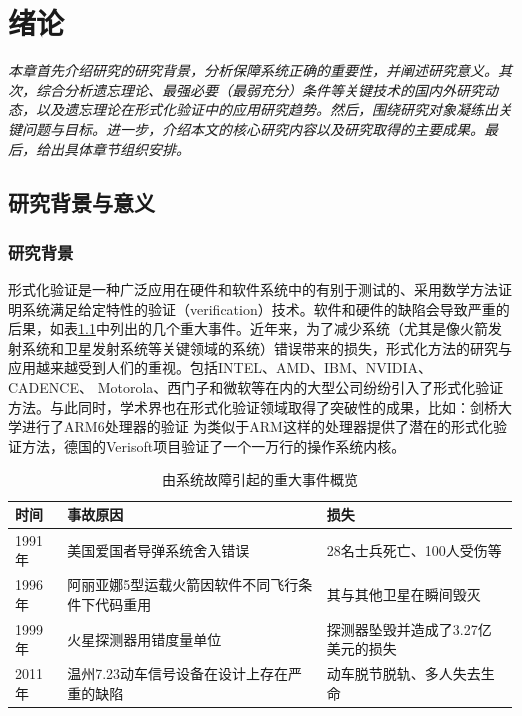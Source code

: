 \chapter{绪论}\label{chapter01}
{\em 本章首先介绍研究的研究背景，分析保障系统正确的重要性，并阐述研究意义。其次，综合分析遗忘理论、最强必要（最弱充分）条件等关键技术的国内外研究动态，以及遗忘理论在形式化验证中的应用研究趋势。然后，围绕研究对象凝练出关键问题与目标。进一步，介绍本文的核心研究内容以及研究取得的主要成果。最后，给出具体章节组织安排。}
\section{研究背景与意义}
\subsection{研究背景}

形式化验证是一种广泛应用在硬件\cite{lam2007,lv2000,jani2007Verilog}和软件系统中\cite{yuan2008,gu2005}的有别于测试的、采用数学方法证明系统满足给定特性的验证（verification）技术。软件和硬件的缺陷会导致严重的后果，如表\ref{tab:systemEvents_1.1}中列出的几个重大事件。近年来，为了减少系统（尤其是像火箭发射系统和卫星发射系统等关键领域的系统）错误带来的损失，形式化方法的研究与应用越来越受到人们的重视。包括INTEL、AMD、IBM、NVIDIA、CADENCE、 Motorola、西门子和微软等在内的大型公司纷纷引入了形式化验证方法。与此同时，学术界也在形式化验证领域取得了突破性的成果，比如：剑桥大学进行了ARM6处理器的验证\cite{DBLP:conf/tphol/Fox03} 为类似于ARM这样的处理器提供了潜在的形式化验证方法，德国的Verisoft项目验证了一个一万行的操作系统内核\cite{DBLP:conf/sefm/DaumSS09}。

\begin{table}[htbp]
\caption{由系统故障引起的重大事件概览}
\label{tab:systemEvents_1.1}
\centering
\fontsize{10pt}{\baselineskip}\selectfont
\begin{tabular}{p{}p{}p{}}%
	\toprule
	\textbf{时间}&\textbf{事故原因}&\textbf{损失}\\
	\midrule
    1991年 & 美国爱国者导弹系统舍入错误 & 28名士兵死亡、100人受伤等\\
	1996年 & 阿丽亚娜5型运载火箭因软件不同飞行条件下代码重用 & 其与其他卫星在瞬间毁灭\\
	1999年 & 火星探测器用错度量单位 & 探测器坠毁并造成了3.27亿美元的损失\\
	2011年 & 温州7.23动车信号设备在设计上存在严重的缺陷 &动车脱节脱轨、多人失去生命\\
	
\bottomrule
\end{tabular}
\end{table}

